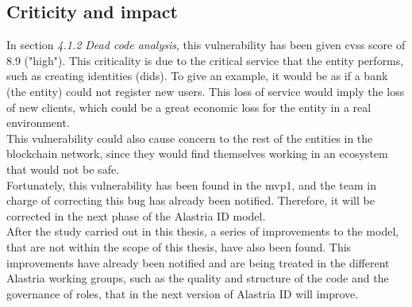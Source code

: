 \subsection{Criticity and impact}
In section \textit{4.1.2 Dead code analysis}, this vulnerability has been given \acrshort{cvss} score of 8.9 ("high"). This criticality is due to the critical service that the entity performs, such as creating identities (\acrshort{did}s). To give an example, it would be as if a bank (the entity) could not register new users. This loss of service would imply the loss of new clients, which could be a great economic loss for the entity in a real environment.\\

This vulnerability could also cause concern to the rest of the entities in the blockchain network, since they would find themselves working in an ecosystem that would not be safe.\\

Fortunately, this vulnerability has been found in the \acrshort{mvp}1, and the team in charge of correcting this bug has already been notified. Therefore, it will be corrected in the next phase of the Alastria ID model.\\

After the study carried out in this thesis, a series of improvements to the model, that are not within the scope of this thesis, have also been found. This improvements have already been notified and are being treated in the different Alastria working groups, such as the quality and structure of the code and the governance of roles, that in the next version of Alastria ID will improve.